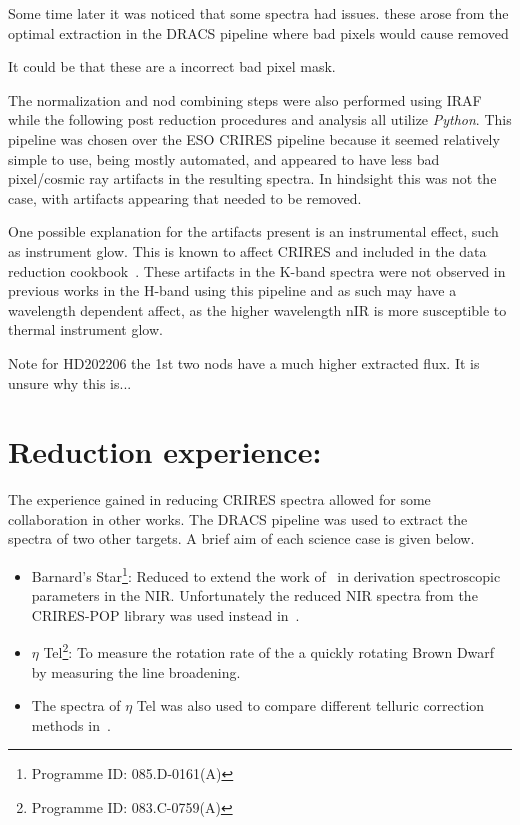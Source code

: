 Some time later it was noticed that some spectra had issues. these arose from the optimal extraction in the DRACS pipeline where bad pixels would cause removed


It could be that these are a incorrect bad pixel mask.




The normalization and nod combining steps were also performed using IRAF while the following post reduction procedures and analysis all utilize \emph{Python}. This pipeline was chosen over the ESO CRIRES pipeline because it seemed relatively simple to use, being mostly automated, and appeared to have less bad pixel/cosmic ray artifacts in the resulting spectra. In hindsight this was not the case, with artifacts appearing that needed to be removed. 

One possible explanation for the artifacts present is an instrumental effect, such as instrument glow. This is known to affect CRIRES and included in the data reduction cookbook~\citep{smoker_very_2012}. These artifacts in the K-band spectra were not observed in previous works in the H-band using this pipeline and as such may have a wavelength dependent affect, as the higher wavelength nIR is more susceptible to thermal instrument glow.


Note for HD202206 the 1st two nods have a much higher extracted flux. It is unsure why this is...

\section{Reduction experience:}
The experience gained in reducing CRIRES spectra allowed for some collaboration in other works. The DRACS pipeline was used to extract the spectra of two other targets. A brief aim of each science case is given below.
\begin{itemize}
\item Barnard's Star\footnote{Programme ID: 085.D-0161(A)}: Reduced to extend the work of~\citet{andreasen_nearinfrared_2016} in derivation spectroscopic parameters in the NIR. Unfortunately the reduced NIR spectra from the CRIRES-POP library was used instead in~\citet{Andreasen et al. (in prep.)}. 
\item $\eta$ Tel\footnote{Programme ID: 083.C-0759(A)}: To measure the rotation rate of the a quickly rotating Brown Dwarf by measuring the line broadening. 
\item The spectra of $\eta$ Tel was also used to compare different telluric correction methods in~\cite{ulmer-moll_telluric_2018}.
\end{itemize}


